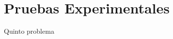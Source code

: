 \documentclass{article}
\begin{document}
    \subsection{}

    \section{Pruebas Experimentales}
    Quinto problema

    \subsection{}

    \subsection{}

    \subsection{}

    \subsection{}

    
\end{document}
